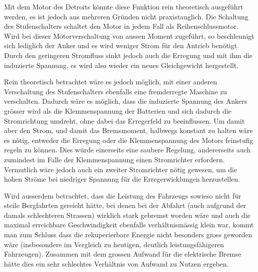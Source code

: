 Mit dem Motor des Detroits könnte diese Funktion rein theoretisch ausgeführt werden, es ist jedoch aus mehreren Gründen nicht praxistauglich. Die Schaltung des Stufenschalters schaltet den Motor in jedem Fall als Reihenschlussmotor. Wird bei dieser Motorverschaltung von aussen Moment zugeführt, so beschleunigt sich lediglich der Anker und es wird weniger Strom für den Antrieb benötigt. Durch den geringeren Stromfluss sinkt jedoch auch die Erregung und mit ihm die induzierte Spannung, es wird also wieder ein neues Gleichgewicht hergestellt.

Rein theoretisch betrachtet wäre es jedoch möglich, mit einer anderen Verschaltung des Stufenschalters ebenfalls eine fremderregte Maschine zu verschalten. Dadurch wäre es möglich, dass die induzierte Spannung des Ankers grösser wird als die Klemmenspannung der Batterien und sich dadurch die Stromrichtung umdreht, ohne dabei das Erregerfeld zu beeinflussen. Um damit aber den Strom, und damit das Bremsmoment, halbwegs konstant zu halten wäre es nötig, entweder die Erregung oder die Klemmenspannung des Motors feinstufig regeln zu können. Dies würde einerseits eine saubere Regelung, andererseits auch zumindest im Falle der Klemmenspannung einen Stromrichter erfordern. Vermutlich wäre jedoch auch ein zweiter Stromrichter nötig gewesen, um die hohen Ströme bei niedriger Spannung für die Erregerwicklungen herzustellen.

Wird ausserdem betrachtet, dass die Leistung des Fahrzeugs sowieso nicht für steile Bergfahrten gereicht hätte, bei denen bei der Abfahrt (auch aufgrund der damals schlechteren Strassen) wirklich stark gebremst worden wäre und auch die maximal erreichbare Geschwindigkeit ebenfalls verhältnismässig klein war, kommt man zum Schluss dass die rekuperierbare Energie nicht besonders gross geworden wäre (insbesondere im Vergleich zu heutigen, deutlich leistungsfähigeren Fahrzeugen). Zusammen mit dem grossen Aufwand für die elektrische Bremse hätte dies ein sehr schlechtes Verhältnis von Aufwand zu Nutzen ergeben.